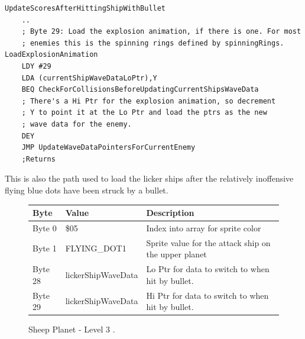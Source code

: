 \begin{lstlisting}
UpdateScoresAfterHittingShipWithBullet
    ..
    ; Byte 29: Load the explosion animation, if there is one. For most
    ; enemies this is the spinning rings defined by spinningRings.
LoadExplosionAnimation   
    LDY #29
    LDA (currentShipWaveDataLoPtr),Y
    BEQ CheckForCollisionsBeforeUpdatingCurrentShipsWaveData
    ; There's a Hi Ptr for the explosion animation, so decrement
    ; Y to point it at the Lo Ptr and load the ptrs as the new
    ; wave data for the enemy.
    DEY
    JMP UpdateWaveDataPointersForCurrentEnemy
    ;Returns
\end{lstlisting}

This is also the path used to load the licker ships after the relatively inoffensive flying blue dots have
been struck by a bullet.

\begin{figure}[H]
  {
  \setlength{\tabcolsep}{3.0pt}
  \setlength\cmidrulewidth{\heavyrulewidth} %
  \begin{adjustbox}{width=12cm}

\begin{tabular}{lll}
\toprule
 Byte    & Value                     & Description                                                        \\
\midrule
 Byte 0  & \$05                       & Index into array for sprite color                                  \\
 Byte 1  & FLYING\_DOT1               & Sprite value for the attack ship on the upper planet               \\
 Byte 28 & lickerShipWaveData         & Lo Ptr for data to switch to when hit by bullet.                                    \\
 Byte 29 & lickerShipWaveData         & Hi Ptr for data to switch to when hit by bullet.                                    \\
\bottomrule
\end{tabular}

  \end{adjustbox}

  }\caption{Sheep Planet - Level 3
.}
\end{figure}

